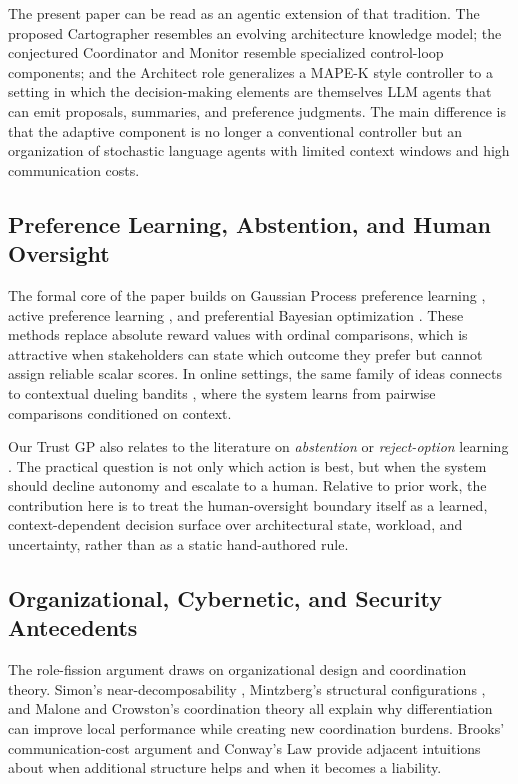 The present paper can be read as an agentic extension of that tradition. The proposed Cartographer resembles an evolving architecture knowledge model; the conjectured Coordinator and Monitor resemble specialized control-loop components; and the Architect role generalizes a MAPE-K style controller to a setting in which the decision-making elements are themselves LLM agents that can emit proposals, summaries, and preference judgments. The main difference is that the adaptive component is no longer a conventional controller but an organization of stochastic language agents with limited context windows and high communication costs.

\subsection{Preference Learning, Abstention, and Human Oversight}

The formal core of the paper builds on Gaussian Process preference learning \cite{chu2005}, active preference learning \cite{houlsby2011}, and preferential Bayesian optimization \cite{gonzalez2017}. These methods replace absolute reward values with ordinal comparisons, which is attractive when stakeholders can state which outcome they prefer but cannot assign reliable scalar scores. In online settings, the same family of ideas connects to contextual dueling bandits \cite{dudik2015}, where the system learns from pairwise comparisons conditioned on context.

Our Trust GP also relates to the literature on \emph{abstention} or \emph{reject-option} learning \cite{bartlett2008}. The practical question is not only which action is best, but when the system should decline autonomy and escalate to a human. Relative to prior work, the contribution here is to treat the human-oversight boundary itself as a learned, context-dependent decision surface over architectural state, workload, and uncertainty, rather than as a static hand-authored rule.

\subsection{Organizational, Cybernetic, and Security Antecedents}

The role-fission argument draws on organizational design and coordination theory. Simon's near-decomposability \cite{simon1962}, Mintzberg's structural configurations \cite{mintzberg1979}, and Malone and Crowston's coordination theory \cite{malone1994} all explain why differentiation can improve local performance while creating new coordination burdens. Brooks' communication-cost argument \cite{brooks1975} and Conway's Law \cite{conway1968} provide adjacent intuitions about when additional structure helps and when it becomes a liability.


